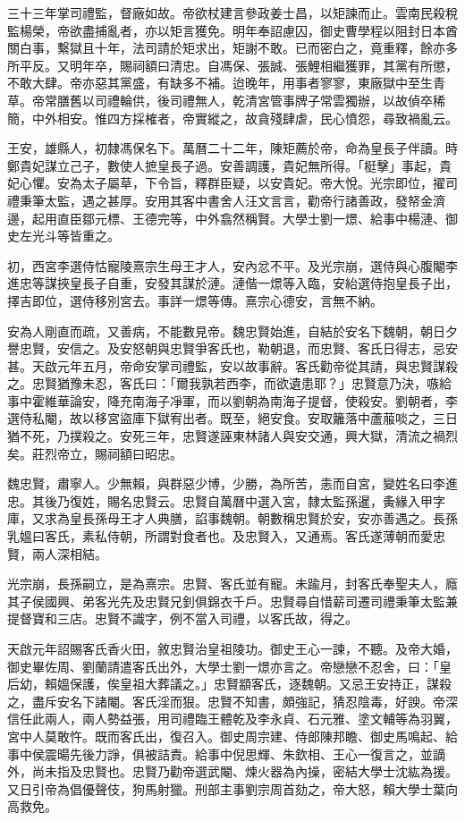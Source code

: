 \begin{pinyinscope}
三十三年掌司禮監，督廠如故。帝欲杖建言參政姜士昌，以矩諫而止。雲南民殺稅監楊榮，帝欲盡捕亂者，亦以矩言獲免。明年奉詔慮囚，御史曹學程以阻封日本酋關白事，繫獄且十年，法司請於矩求出，矩謝不敢。已而密白之，竟重釋，餘亦多所平反。又明年卒，賜祠額曰清忠。自馮保、張誠、張鯉相繼獲罪，其黨有所懲，不敢大肆。帝亦惡其黨盛，有缺多不補。迨晚年，用事者寥寥，東廠獄中至生青草。帝常膳舊以司禮輪供，後司禮無人，乾清宮管事牌子常雲獨辦，以故偵卒稀簡，中外相安。惟四方採榷者，帝實縱之，故貪殘肆虐，民心憤怨，尋致禍亂云。

王安，雄縣人，初隸馮保名下。萬曆二十二年，陳矩薦於帝，命為皇長子伴讀。時鄭貴妃謀立己子，數使人摭皇長子過。安善調護，貴妃無所得。「梃擊」事起，貴妃心懼。安為太子屬草，下令旨，釋群臣疑，以安貴妃。帝大悅。光宗即位，擢司禮秉筆太監，遇之甚厚。安用其客中書舍人汪文言言，勸帝行諸善政，發帑金濟邊，起用直臣鄒元標、王德完等，中外翕然稱賢。大學士劉一燝、給事中楊漣、御史左光斗等皆重之。

初，西宮李選侍怙寵陵熹宗生母王才人，安內忿不平。及光宗崩，選侍與心腹閹李進忠等謀挾皇長子自重，安發其謀於漣。漣偕一燝等入臨，安紿選侍抱皇長子出，擇吉即位，選侍移別宮去。事詳一燝等傳。熹宗心德安，言無不納。

安為人剛直而疏，又善病，不能數見帝。魏忠賢始進，自結於安名下魏朝，朝日夕譽忠賢，安信之。及安怒朝與忠賢爭客氏也，勒朝退，而忠賢、客氏日得志，忌安甚。天啟元年五月，帝命安掌司禮監，安以故事辭。客氏勸帝從其請，與忠賢謀殺之。忠賢猶豫未忍，客氏曰：「爾我孰若西李，而欲遺患耶？」忠賢意乃決，嗾給事中霍維華論安，降充南海子凈軍，而以劉朝為南海子提督，使殺安。劉朝者，李選侍私閹，故以移宮盜庫下獄宥出者。既至，絕安食。安取籬落中蘆菔啖之，三日猶不死，乃撲殺之。安死三年，忠賢遂誣東林諸人與安交通，興大獄，清流之禍烈矣。莊烈帝立，賜祠額曰昭忠。

魏忠賢，肅寧人。少無賴，與群惡少博，少勝，為所苦，恚而自宮，變姓名曰李進忠。其後乃復姓，賜名忠賢云。忠賢自萬曆中選入宮，隸太監孫暹，夤緣入甲字庫，又求為皇長孫母王才人典膳，諂事魏朝。朝數稱忠賢於安，安亦善遇之。長孫乳媼曰客氏，素私侍朝，所謂對食者也。及忠賢入，又通焉。客氏遂薄朝而愛忠賢，兩人深相結。

光宗崩，長孫嗣立，是為熹宗。忠賢、客氏並有寵。未踰月，封客氏奉聖夫人，廕其子侯國興、弟客光先及忠賢兄釗俱錦衣千戶。忠賢尋自惜薪司遷司禮秉筆太監兼提督寶和三店。忠賢不識字，例不當入司禮，以客氏故，得之。

天啟元年詔賜客氏香火田，敘忠賢治皇祖陵功。御史王心一諫，不聽。及帝大婚，御史畢佐周、劉蘭請遣客氏出外，大學士劉一燝亦言之。帝戀戀不忍舍，曰：「皇后幼，賴媼保護，俟皇祖大葬議之。」忠賢顓客氏，逐魏朝。又忌王安持正，謀殺之，盡斥安名下諸閹。客氏淫而狠。忠賢不知書，頗強記，猜忍陰毒，好諛。帝深信任此兩人，兩人勢益張，用司禮臨王體乾及李永貞、石元雅、塗文輔等為羽翼，宮中人莫敢忤。既而客氏出，復召入。御史周宗建、侍郎陳邦瞻、御史馬鳴起、給事中侯震暘先後力諍，俱被詰責。給事中倪思輝、朱欽相、王心一復言之，並謫外，尚未指及忠賢也。忠賢乃勸帝選武閹、煉火器為內操，密結大學士沈紘為援。又日引帝為倡優聲伎，狗馬射獵。刑部主事劉宗周首劾之，帝大怒，賴大學士葉向高救免。


\end{pinyinscope}
